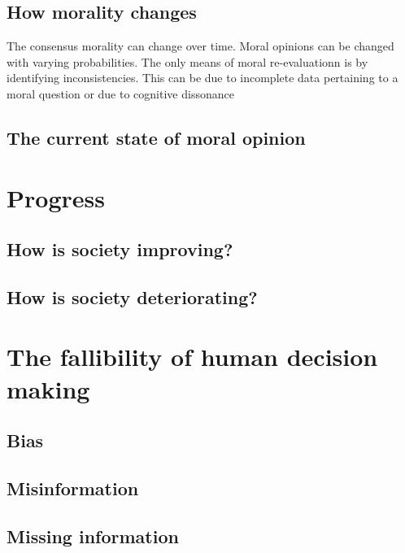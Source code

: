 \subsection{How morality changes}
The consensus morality can change over time.
Moral opinions can be changed with varying probabilities.
The only means of moral re-evaluationn is by identifying inconsistencies.
This can be due to incomplete data pertaining to a moral question or due to cognitive dissonance

\subsection{The current state of moral opinion}

\section{Progress}
\subsection{How is society improving?}

\subsection{How is society deteriorating?}

\section{The fallibility of human decision making}
\subsection{Bias}
\subsection{Misinformation}
\subsection{Missing information}

